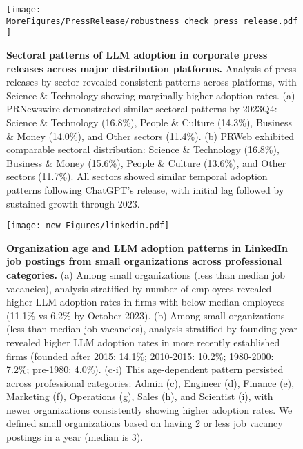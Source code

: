 \clearpage
\newpage






\begin{figure}[htb]
\centering
\texttt{[image: MoreFigures/PressRelease/robustness\_check\_press\_release.pdf]}
\caption{
\textbf{Sectoral patterns of LLM adoption in corporate press releases across major distribution platforms.}
Analysis of press releases by sector revealed consistent patterns across platforms, with Science \& Technology showing marginally higher adoption rates. (a) PRNewswire demonstrated similar sectoral patterns by 2023Q4: Science \& Technology (16.8\%), People \& Culture (14.3\%), Business \& Money (14.0\%), and Other sectors (11.4\%). (b) PRWeb exhibited comparable sectoral distribution: Science \& Technology (16.8\%), Business \& Money (15.6\%), People \& Culture (13.6\%), and Other sectors (11.7\%). All sectors showed similar temporal adoption patterns following ChatGPT's release, with initial lag followed by sustained growth through 2023. 
}
\label{fig:main:3}
\end{figure}
\clearpage
\newpage



\begin{figure}[htb]
\centering
\texttt{[image: new\_Figures/linkedin.pdf]}
\caption{
\textbf{Organization age and LLM adoption patterns in LinkedIn job postings from small organizations across professional categories.}
(a) Among small organizations (less than median job vacancies), analysis stratified by number of employees revealed higher LLM adoption rates in firms with below median employees (11.1\% vs 6.2\% by October 2023). (b) Among small organizations (less than median job vacancies), analysis stratified by founding year revealed higher LLM adoption rates in more recently established firms (founded after 2015: 14.1\%; 2010-2015: 10.2\%; 1980-2000: 7.2\%; pre-1980: 4.0\%). (c-i) This age-dependent pattern persisted across professional categories: Admin (c), Engineer (d), Finance (e), Marketing (f), Operations (g), Sales (h), and Scientist (i), with newer organizations consistently showing higher adoption rates. We defined small organizations based on having 2 or less job vacancy postings in a year (median is 3).
}
\label{fig:main:4}
\end{figure}
\clearpage
\newpage




\clearpage



